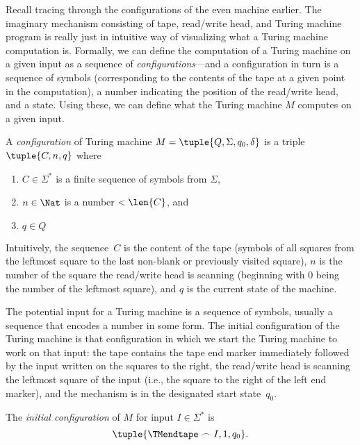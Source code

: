 \documentclass[../../../include/open-logic-section]{subfiles}
\begin{document}

\begin{explain}
Recall tracing through the configurations of the even machine earlier.
The imaginary mechanism consisting of tape, read/write head, and
Turing machine program is really just in intuitive way of visualizing
what a Turing machine computation is.  Formally, we can define the
computation of a Turing machine on a given input as a sequence of
\emph{configurations}---and a configuration in turn is a sequence of
symbols (corresponding to the contents of the tape at a given point in
the computation), a number indicating the position of the read/write
head, and a state.  Using these, we can define what the Turing machine
$M$ computes on a given input.
\end{explain}

\begin{defn}[Configuration]
A \emph{configuration} of Turing machine $M = \tuple{Q, \Sigma, q_0,
\delta}$ is a triple $\tuple{C, n, q}$ where
\begin{enumerate}
\item $C \in \Sigma^*$ is a finite sequence of symbols from $\Sigma$,
\item $n \in \Nat$ is a number $< \len{C}$, and
\item $q \in Q$
\end{enumerate}
Intuitively, the sequence~$C$ is the content of the tape (symbols of
all squares from the leftmost square to the last non-blank or
previously visited square), $n$ is the number of the square the
read/write head is scanning (beginning with $0$ being the number of
the leftmost square), and $q$ is the current state of the machine.
\end{defn}

\begin{explain}
The potential input for a Turing machine is a sequence of symbols,
usually a sequence that encodes a number in some form.  The initial
configuration of the Turing machine is that configuration in which we
start the Turing machine to work on that input: the tape contains the
tape end marker immediately followed by the input written on the
squares to the right, the read/write head is scanning the leftmost
square of the input (i.e., the square to the right of the left end
marker), and the mechanism is in the designated start state~$q_0$.
\end{explain}

\begin{defn}
The \emph{initial configuration} of $M$ for input $I \in \Sigma^*$ is
\[
\tuple{\TMendtape \frown I, 1, q_0}.
\]
\end{defn}
\end{document}
